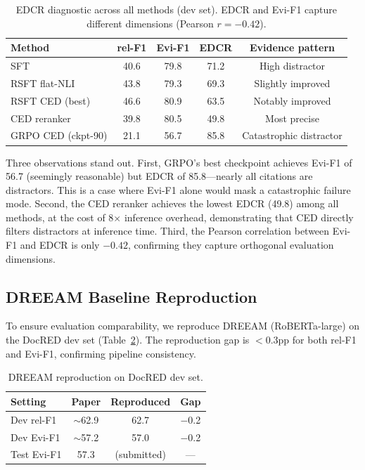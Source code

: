 \documentclass[11pt,a4paper]{article}
\begin{document}
\begin{table}[t]
\centering
\caption{EDCR diagnostic across all methods (dev set). EDCR and Evi-F1 capture different dimensions (Pearson $r = -0.42$).}
\label{tab:edcr_diag}
\begin{tabular}{lcccc}
\toprule
\textbf{Method} & \textbf{rel-F1} & \textbf{Evi-F1} & \textbf{EDCR} & \textbf{Evidence pattern} \\
\midrule
SFT & 40.6 & 79.8 & 71.2 & High distractor \\
RSFT flat-NLI & 43.8 & 79.3 & 69.3 & Slightly improved \\
RSFT CED (best) & 46.6 & 80.9 & 63.5 & Notably improved \\
CED reranker & 39.8 & 80.5 & 49.8 & Most precise \\
GRPO CED (ckpt-90) & 21.1 & 56.7 & 85.8 & Catastrophic distractor \\
\bottomrule
\end{tabular}
\end{table}

Three observations stand out. First, GRPO's best checkpoint achieves Evi-F1 of 56.7 (seemingly reasonable) but EDCR of 85.8---nearly all citations are distractors. This is a case where Evi-F1 alone would mask a catastrophic failure mode. Second, the CED reranker achieves the lowest EDCR (49.8) among all methods, at the cost of 8$\times$ inference overhead, demonstrating that CED directly filters distractors at inference time. Third, the Pearson correlation between Evi-F1 and EDCR is only $-0.42$, confirming they capture orthogonal evaluation dimensions.

\subsection{DREEAM Baseline Reproduction}

To ensure evaluation comparability, we reproduce DREEAM (RoBERTa-large) on the DocRED dev set (Table~\ref{tab:dreeam_repro}). The reproduction gap is $<$0.3pp for both rel-F1 and Evi-F1, confirming pipeline consistency.

\begin{table}[h]
\centering
\caption{DREEAM reproduction on DocRED dev set.}
\label{tab:dreeam_repro}
\begin{tabular}{lccc}
\toprule
\textbf{Setting} & \textbf{Paper} & \textbf{Reproduced} & \textbf{Gap} \\
\midrule
Dev rel-F1 & $\sim$62.9 & 62.7 & $-$0.2 \\
Dev Evi-F1 & $\sim$57.2 & 57.0 & $-$0.2 \\
Test Evi-F1 & 57.3 & (submitted) & --- \\
\bottomrule
\end{tabular}
\end{table}
\end{document}
